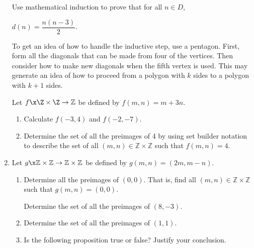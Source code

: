 \begin{enumerate}
Use mathematical induction to prove that for all  $n \in D$,
\begin{center}
$d( n ) = \dfrac{{n\left( {n - 3} \right)}}{2}$.
\end{center}

\hint  To get an idea of how to handle the inductive step, use a pentagon.  First, form all the diagonals that can be made from  four  of the vertices.  Then consider how to make new diagonals when the fifth vertex is used.  This may generate an idea of how to proceed from a polygon with  $k$  sides  to a polygon with  $k + 1$  sides.  \label{exer:sec62-6}


\xitem Let $f\x \Z \times \Z \to \mathbb{Z}$ be defined by  
$f( {m, n} ) = m + 3n$. \label{exer:sec61-7}

\begin{enumerate}
  \item Calculate  $f( { - 3, 4} )$ and  $f( { - 2, - 7} )$.

  \item Determine the set of all the preimages of  4 by using set builder notation to describe the set of all $\left( {m, n} \right) \in \mathbb{Z} \times \mathbb{Z}$ such that  
$f( {m, n} ) = 4$.
\end{enumerate}

\item Let $g\x \mathbb{Z} \times \mathbb{Z} \to \mathbb{Z} \times \mathbb{Z}$ be defined by  
$g( {m, n} ) = \left( {2m, m - n} \right)$.  
\label{exer:sec61-8}%

\begin{enumerate}
  \yitem Calculate  $g( {3, 5} )$ and  $g( { - 1, 4} )$.

  \item Determine all the preimages of  $\left( {0, 0} \right)$.  That is, find all  
$( {m, n} ) \in \mathbb{Z} \times \mathbb{Z}$ such that  $g( {m, n} ) = ( {0, 0} )$.

  \yitem Determine the set of all the preimages of  $( {8,  - 3} )$.

  \item Determine the set of all the preimages of  $( {1, 1} )$.

  \item Is the following proposition true or false?  Justify your conclusion.
\end{enumerate}



\end{enumerate}
